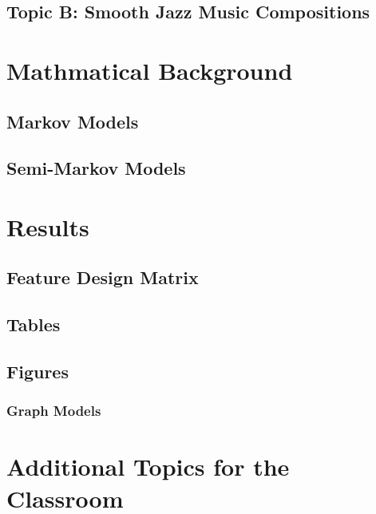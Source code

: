 \subsection{Topic B: Smooth Jazz Music Compositions}

\section{Mathmatical Background}

\subsection{Markov Models}

\subsection{Semi-Markov Models}


\section{Results}

\subsection{Feature Design Matrix}

\subsection{Tables}

\subsection{Figures}

\subsubsection{Graph Models}

\section{Additional Topics for the Classroom}

\begin{enumerate}
\end{enumerate}



\begin{thebibliography}{00}

\end{thebibliography}


